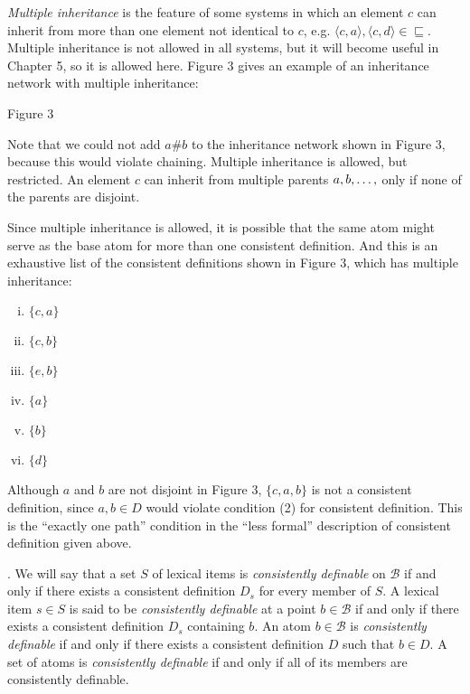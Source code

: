\emph{Multiple inheritance} is the feature of some systems in which an element $c$ can inherit from more than one element not identical to $c$, e.g. $\langle c,a\rangle,\langle c,d\rangle\in\sqsubseteq$. Multiple inheritance is not allowed in all systems, but it will become useful in Chapter 5, so it is allowed here. Figure 3 gives an example of an inheritance network with multiple inheritance:
\par\vspace{5mm}
\centerline{
}
\centerline{Figure 3}
\par\vspace{5mm}
\noindent Note that we could not add $a\# b$ to the inheritance network shown in Figure 3, because this would violate chaining. Multiple inheritance is allowed, but restricted. An element $c$ can inherit from multiple parents $a,b,\mathellipsis,$ only if none of the parents are disjoint.

Since multiple inheritance is allowed, it is possible that the same atom might serve as the base atom for more than one consistent definition. And this is an exhaustive list of the consistent definitions shown in Figure 3, which has multiple inheritance:
\begin{enumerate}[(i)]
\item $\{c,a\}$
\item $\{c,b\}$
\item $\{e,b\}$
\item $\{a\}$
\item $\{b\}$
\item $\{d\}$
\end{enumerate}
 Although $a$ and $b$ are not disjoint in Figure 3, $\{c,a,b\}$ is not a consistent definition, since $a,b\in D$ would violate condition (2) for consistent definition. This is the ``exactly one path'' condition in the ``less formal'' description of consistent definition given above. 
 
\par\vspace{3mm}
. We will say that a set $S$ of lexical items is \emph{consistently definable} on $\mathcal{B}$ if and only if there exists a consistent definition $D_s$ for every member of $S$. A lexical item $s\in S$ is said to be \emph{consistently definable} at a point $b\in\mathcal{B}$ if and only if there exists a consistent definition $D_s$ containing $b$. An atom $b\in\mathcal{B}$ is \emph{consistently definable} if and only if there exists a consistent definition $D$ such that $b\in D$. A set of atoms is \emph{consistently definable} if and only if all of its members are consistently definable.

